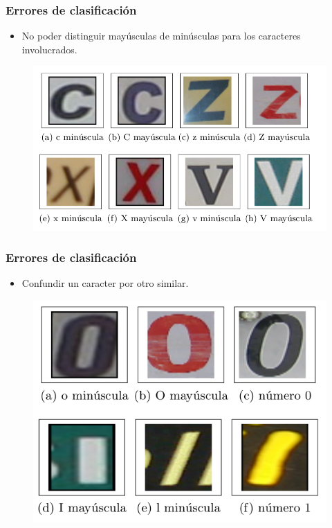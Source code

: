 		\begin{frame}
			\frametitle{Errores de clasificación}
			\begin{itemize}
				\item No poder distinguir mayúsculas de minúsculas para los caracteres involucrados.
			\end{itemize}
			\begin{figure}[htbp!]
				\centering
				\centerline{
					\includegraphics[height=0.50\paperheight]{imgs/error_may_min.png}
				}
			\end{figure}
		\end{frame}
		\begin{frame}
			\frametitle{Errores de clasificación}
			\begin{itemize}
				\item Confundir un caracter por otro similar.
			\end{itemize}
			\begin{figure}[htbp!]
				\centering
				\centerline{
					\includegraphics[height=0.50\paperheight]{imgs/error_conf_simbolos.png}
				}
			\end{figure}
		\end{frame}
